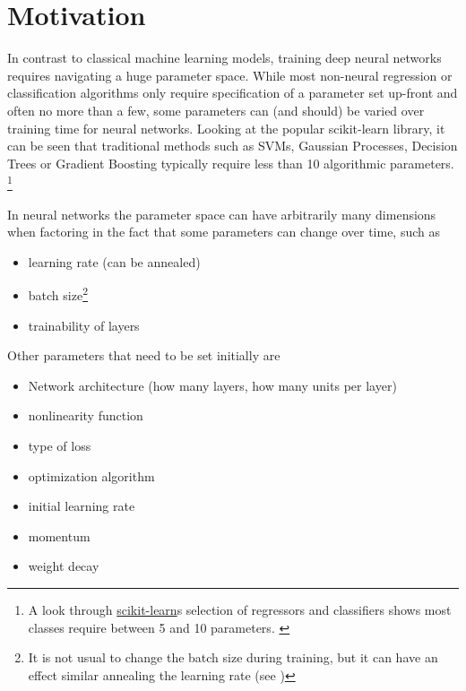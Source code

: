 \hypertarget{sec:motivation}{%
\section{Motivation}\label{sec:motivation}}

In contrast to classical machine learning models, training deep neural networks requires navigating a huge parameter
space. While most non-neural regression or classification algorithms only require specification of a parameter set
up-front and often no more than a few, some parameters can (and should) be varied over training time for neural
networks. Looking at the popular scikit-learn library, it can be seen that traditional methods such as SVMs, Gaussian
Processes, Decision Trees or Gradient Boosting typically require less than 10 algorithmic parameters.
\footnote{A look through \href{http://scikit-learn.org/stable/supervised_learning.html\#supervised-learning}{scikit-learn}s
selection of regressors and classifiers shows most classes require between 5 and 10 parameters. \citep{scikit-learn}}

In neural networks the parameter space can have arbitrarily many dimensions when factoring in the fact that some
parameters can change over time, such as

\begin{itemize}
    \item
        learning rate (can be annealed)
    \item
        batch size\footnote{It is not usual to change the batch size during
            training, but it can have an effect similar annealing the learning
        rate (see \cite{DBLP:journals/corr/abs-1711-00489})}
        \item
            trainability of layers
    \end{itemize}

    Other parameters that need to be set initially are

    \begin{itemize}
        \item
            Network architecture (how many layers, how many units per layer)
        \item
            nonlinearity function
        \item
            type of loss
        \item
            optimization algorithm
        \item
            initial learning rate
        \item
            momentum
        \item
            weight decay
    \end{itemize}

